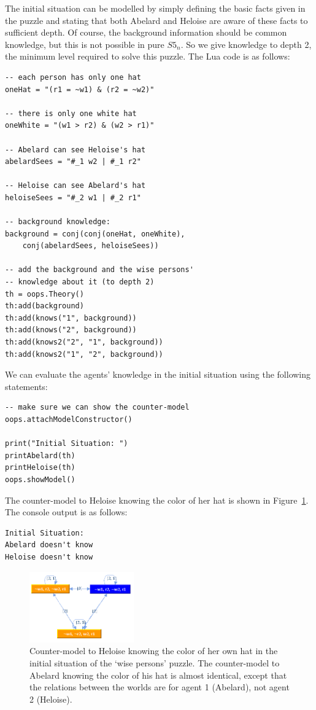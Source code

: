 The initial situation can be modelled by simply defining the basic facts given in the puzzle and stating that both Abelard and Heloise are aware of these facts to sufficient depth.
Of course, the background information should be common knowledge, but this is not possible in pure $S5_n$.
So we give knowledge to depth 2, the minimum level required to solve this puzzle.
The Lua code is as follows:
\begin{lstlisting}
-- each person has only one hat
oneHat = "(r1 = ~w1) & (r2 = ~w2)"

-- there is only one white hat
oneWhite = "(w1 > r2) & (w2 > r1)"

-- Abelard can see Heloise's hat
abelardSees = "#_1 w2 | #_1 r2"

-- Heloise can see Abelard's hat
heloiseSees = "#_2 w1 | #_2 r1"

-- background knowledge:
background = conj(conj(oneHat, oneWhite),
    conj(abelardSees, heloiseSees))

-- add the background and the wise persons'
-- knowledge about it (to depth 2)
th = oops.Theory()
th:add(background)
th:add(knows("1", background))
th:add(knows("2", background))
th:add(knows2("2", "1", background))
th:add(knows2("1", "2", background))
\end{lstlisting}
We can evaluate the agents' knowledge in the initial situation using the following statements:
\begin{lstlisting}
-- make sure we can show the counter-model
oops.attachModelConstructor()

print("Initial Situation: ")
printAbelard(th)
printHeloise(th)
oops.showModel()
\end{lstlisting}
The counter-model to Heloise knowing the color of her hat is shown in Figure~\ref{fig:output1}. The console output is as follows:
\lstset{language=}
\begin{lstlisting}
Initial Situation:
Abelard doesn't know
Heloise doesn't know
\end{lstlisting}
\lstset{language=lua}

\begin{figure}
\centering
\includegraphics[width=0.4\textwidth]{images/demo04}
\caption{Counter-model to Heloise knowing the color of her own hat in the initial situation of the `wise persons' puzzle. The counter-model to Abelard knowing the color of his hat is almost identical, except that the relations between the worlds are for agent 1 (Abelard), not agent 2 (Heloise).}
\label{fig:output1}
\end{figure}

